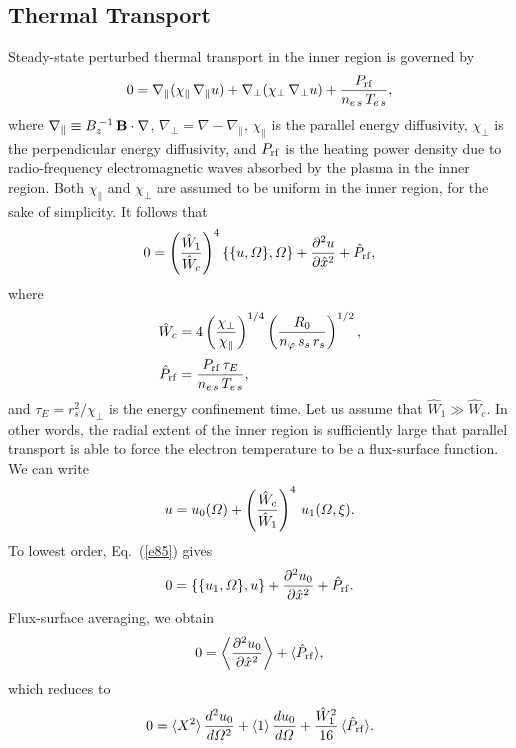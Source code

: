 \documentclass[12pt,prb,aps]{revtex4-1}
\begin{document}
\subsection{Thermal Transport}\label{sthermal}
Steady-state perturbed thermal transport in the inner region is
governed by\,\cite{plasma}
\begin{equation}
0 = \nabla_\parallel(\chi_\parallel\,\nabla_\parallel u)+ 
\nabla_\perp(\chi_\perp\,\nabla_\perp u) + \frac{P_{\rm rf}}{n_{e\,s}\,T_{e\,s}},
\end{equation}
where $\nabla_\parallel \equiv B_z^{\,-1}\,{\bf B}\cdot\nabla$,
$\nabla_\perp = \nabla - \nabla_\parallel$, $\chi_\parallel$ is the
parallel energy diffusivity, $\chi_\perp$ is the perpendicular
energy diffusivity, and $P_{\rm rf}$ is the heating power density due to radio-frequency electromagnetic waves absorbed by the plasma in the inner region. Both $\chi_\parallel$ and $\chi_\perp$ are assumed to be uniform in the inner region, for the sake of simplicity. 
It follows that
\begin{equation}\label{e85}
0 = \left(\frac{\hat{W}_1}{\hat{W}_c}\right)^4\{\{u,{\mit\Omega}\},{\mit\Omega}\} + \frac{\partial^2 u}{\partial\hat{x}^2}+\hat{P}_{\rm rf},
\end{equation}
where
\begin{align}
\hat{W}_c &= 4\left(\frac{\chi_\perp}{\chi_\parallel}\right)^{1/4}\left(\frac{R_0}{n_\varphi\,s_s\,r_s}\right)^{1/2},\\[0.5ex]
\hat{P}_{\rm rf} &= \frac{P_{\rm rf}\,\tau_E}{n_{e\,s}\,T_{e\,s}},
\end{align}
and $\tau_E=r_s^2/\chi_\perp$ is the energy confinement time. 
Let us assume that $\hat{W}_1\gg \hat{W}_c$. In other words, the
radial extent of the inner region is sufficiently large that parallel transport is able to force the electron temperature to be a flux-surface function.\cite{fitz}
We can write
\begin{equation}
u= u_0({\mit\Omega})+\left(\frac{\hat{W}_c}{\hat{W}_1}\right)^4\,u_1({\mit\Omega},\xi).
\end{equation}
To lowest order, Eq.~(\ref{e85}) gives
\begin{equation}
0 = \{\{u_1,{\mit\Omega}\},u\} + \frac{\partial^2 u_0}{\partial\hat{x}^2}+ \hat{P}_{\rm rf}.
\end{equation}
Flux-surface averaging, we obtain
\begin{equation}
0=\left\langle \frac{\partial^2 u_0}{\partial\hat{x}^2}
\right\rangle + \langle \hat{P}_{\rm rf}\rangle,
\end{equation}
which reduces to
\begin{equation}
0=\langle X^2\rangle \,\frac{d^2u_0}{d{\mit\Omega}^2} +\langle 1\rangle\,\frac{du_0}{d{\mit\Omega}} + \frac{\hat{W}_1^2}{16}\,\langle \hat{P}_{\rm rf}\rangle.
\end{equation}
\end{document}
